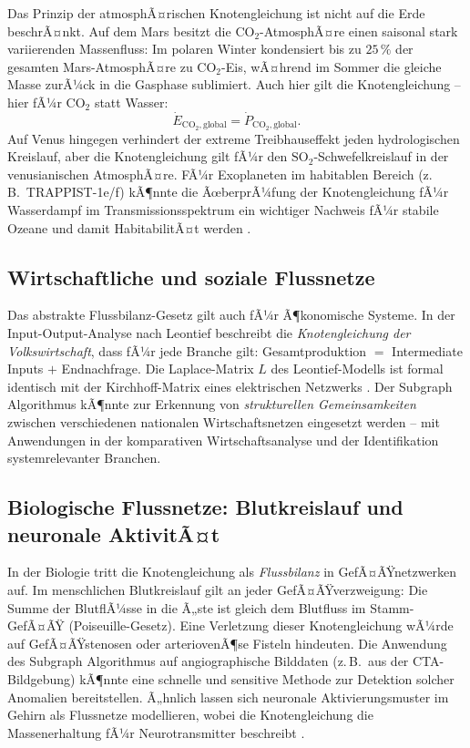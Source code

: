 ﻿\documentclass[a4paper,12pt]{article}
\theoremstyle{definition}
\begin{document}
Das Prinzip der atmosphÃ¤rischen Knotengleichung ist nicht auf die Erde
beschrÃ¤nkt. Auf dem Mars besitzt die $\mathrm{CO}_2$-AtmosphÃ¤re einen
saisonal stark variierenden Massenfluss: Im polaren Winter kondensiert
bis zu $25\,\%$ der gesamten Mars-AtmosphÃ¤re zu $\mathrm{CO}_2$-Eis,
wÃ¤hrend im Sommer die gleiche Masse zurÃ¼ck in die Gasphase sublimiert.
Auch hier gilt die Knotengleichung -- hier fÃ¼r $\mathrm{CO}_2$ statt
Wasser:
\[
  \dot{E}_{\mathrm{CO}_2,\mathrm{global}} = \dot{P}_{\mathrm{CO}_2,\mathrm{global}}.
\]
Auf Venus hingegen verhindert der extreme Treibhauseffekt jeden
hydrologischen Kreislauf, aber die Knotengleichung gilt fÃ¼r den
$\mathrm{SO}_2$-Schwefelkreislauf in der venusianischen AtmosphÃ¤re.
FÃ¼r Exoplaneten im habitablen Bereich (z.\,B.\ TRAPPIST-1e/f) kÃ¶nnte
die ÃœberprÃ¼fung der Knotengleichung fÃ¼r Wasserdampf im Transmissions\-spektrum
ein wichtiger Nachweis fÃ¼r stabile Ozeane und damit HabitabilitÃ¤t werden
\cite{turbet2020}.

\subsection{Wirtschaftliche und soziale Flussnetze}

Das abstrakte Flussbilanz-Gesetz gilt auch fÃ¼r Ã¶konomische Systeme.
In der Input-Output-Analyse nach Leontief beschreibt die
\emph{Knotengleichung der Volkswirtschaft}, dass fÃ¼r jede Branche gilt:
Gesamtproduktion $=$ Intermediate Inputs $+$ Endnachfrage. Die Laplace-Matrix
$L$ des Leontief-Modells ist formal identisch mit der Kirchhoff-Matrix eines
elektrischen Netzwerks \cite{leontief1986}. Der Subgraph Algorithmus kÃ¶nnte
zur Erkennung von \emph{strukturellen Gemeinsamkeiten} zwischen verschiedenen
nationalen Wirtschaftsnetzen eingesetzt werden -- mit Anwendungen in der
komparativen Wirtschaftsanalyse und der Identifikation systemrelevanter
Branchen.

\subsection{Biologische Flussnetze: Blutkreislauf und neuronale AktivitÃ¤t}

In der Biologie tritt die Knotengleichung als \emph{Flussbilanz} in
GefÃ¤ÃŸ\-netzwerken auf. Im menschlichen Blutkreislauf gilt an jeder
GefÃ¤ÃŸ\-verzweigung: Die Summe der BlutflÃ¼sse in die Ã„ste ist gleich dem
Blutfluss im Stamm-GefÃ¤ÃŸ (Poiseuille-Gesetz). Eine Verletzung dieser
Knotengleichung wÃ¼rde auf GefÃ¤ÃŸstenosen oder arteriovenÃ¶se Fisteln
hindeuten. Die Anwendung des Subgraph Algorithmus auf angiographische
Bilddaten (z.\,B.\ aus der CTA-Bildgebung) kÃ¶nnte eine schnelle und
sensitive Methode zur Detektion solcher Anomalien bereitstellen.
Ã„hnlich lassen sich neuronale Aktivierungsmuster im Gehirn als Flussnetze
modellieren, wobei die Knotengleichung die Massenerhaltung fÃ¼r
Neurotransmitter beschreibt \cite{sporns2005}.
\end{document}
